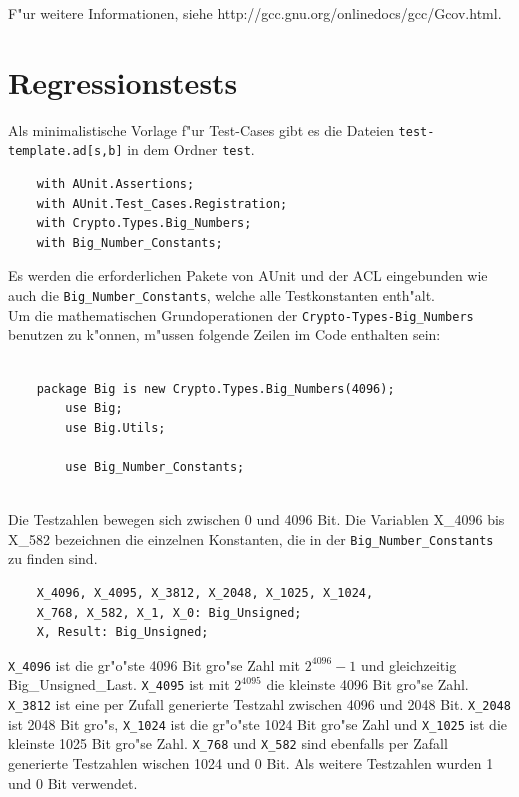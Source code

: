 F"ur weitere Informationen, siehe http://gcc.gnu.org/onlinedocs/gcc/Gcov.html.
\chapter{Regressionstests}

Als minimalistische Vorlage f"ur Test-Cases gibt es die Dateien {\tt test-template.ad[s,b]} in dem Ordner {\tt test}.

\begin{lstlisting}
	with AUnit.Assertions; 
	with AUnit.Test_Cases.Registration;
	with Crypto.Types.Big_Numbers;
	with Big_Number_Constants;

\end{lstlisting}


Es werden die erforderlichen Pakete von AUnit und der ACL eingebunden wie auch die {\tt Big\_Number\_Constants}, welche alle Testkonstanten enth"alt.\\
Um die mathematischen Grundoperationen der {\tt Crypto-Types-Big\_Numbers} benutzen zu k"onnen, m"ussen folgende Zeilen im Code enthalten sein:

\begin{lstlisting}
	
    package Big is new Crypto.Types.Big_Numbers(4096);
    	use Big;
    	use Big.Utils;

    	use Big_Number_Constants;
    	
\end{lstlisting}

Die Testzahlen bewegen sich zwischen 0 und 4096 Bit.
Die Variablen X\_4096 bis X\_582 bezeichnen die einzelnen Konstanten, die in der {\tt Big\_Number\_Constants} zu finden sind.\\

\begin{lstlisting}
    X_4096, X_4095, X_3812, X_2048, X_1025, X_1024,
    X_768, X_582, X_1, X_0: Big_Unsigned;
    X, Result: Big_Unsigned;
\end{lstlisting}

{\tt X\_4096} ist die gr"o"ste 4096 Bit gro"se Zahl mit $2^{4096} - 1$ und gleichzeitig Big\_Unsigned\_Last. {\tt X\_4095} ist mit $2^{4095}$ die kleinste 4096 Bit gro"se Zahl.
{\tt X\_3812} ist eine per Zufall generierte Testzahl zwischen 4096 und 2048 Bit.
{\tt X\_2048} ist 2048 Bit gro"s, {\tt X\_1024} ist die gr"o"ste 1024 Bit gro"se Zahl und {\tt X\_1025} ist die kleinste 1025 Bit gro"se Zahl.
{\tt X\_768} und {\tt X\_582} sind ebenfalls per Zafall generierte Testzahlen wischen 1024 und 0 Bit.
Als weitere Testzahlen wurden 1 und 0 Bit verwendet.

